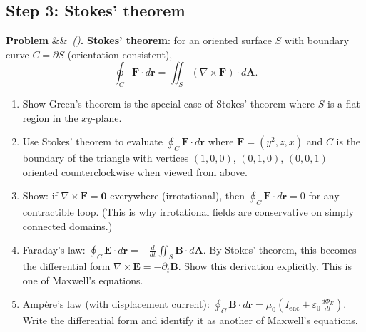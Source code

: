 \documentclass[12pt,a4paper]{article}
\newcounter{problem}
\newenvironment{problem}[1][]{\refstepcounter{problem}\par\vspace{6pt}\noindent\textbf{\color{MidBlue}Problem \theproblem}\ifx&#1&\else\ \textit{(#1)}\fi\textbf{.}\enskip}{\par\vspace{4pt}}
\begin{document}
\subsection{Step 3: Stokes' theorem}

\begin{problem}
\label{prob:stokes}
\textbf{Stokes' theorem}: for an oriented surface $S$ with boundary curve $C=\partial S$ (orientation consistent),
\[
  \oint_C\mathbf{F}\cdot d\mathbf{r} = \iint_S(\nabla\times\mathbf{F})\cdot d\mathbf{A}.
\]
\begin{enumerate}[label=(\alph*),topsep=2pt]
  \item Show Green's theorem is the special case of Stokes' theorem where $S$ is a flat region in the $xy$-plane.
  \item Use Stokes' theorem to evaluate $\oint_C\mathbf{F}\cdot d\mathbf{r}$ where $\mathbf{F}=(y^2,z,x)$ and $C$ is the boundary of the triangle with vertices $(1,0,0)$, $(0,1,0)$, $(0,0,1)$ oriented counterclockwise when viewed from above.
  \item Show: if $\nabla\times\mathbf{F}=\mathbf{0}$ everywhere (irrotational), then $\oint_C\mathbf{F}\cdot d\mathbf{r}=0$ for any contractible loop. (This is why irrotational fields are conservative on simply connected domains.)
  \item Faraday's law: $\oint_C\mathbf{E}\cdot d\mathbf{r} = -\frac{d}{dt}\iint_S\mathbf{B}\cdot d\mathbf{A}$. By Stokes' theorem, this becomes the differential form $\nabla\times\mathbf{E} = -\partial_t\mathbf{B}$. Show this derivation explicitly. This is one of Maxwell's equations.
  \item Amp\`{e}re's law (with displacement current): $\oint_C\mathbf{B}\cdot d\mathbf{r} = \mu_0\left(I_{\text{enc}} + \varepsilon_0\frac{d\Phi_E}{dt}\right)$. Write the differential form and identify it as another of Maxwell's equations.
\end{enumerate}
\end{problem}
\end{document}
